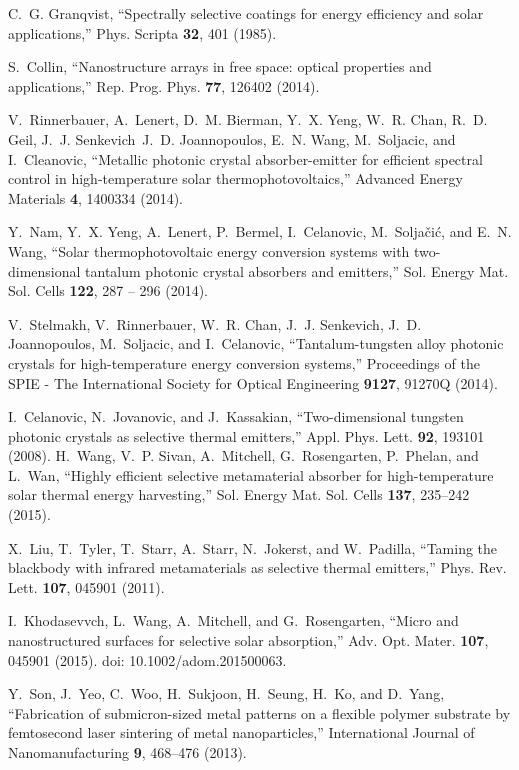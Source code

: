 \documentclass[10pt,letterpaper]{article}
\begin{document}
\begin{thebibliography}{100}
C.~G. Granqvist, \enquote{Spectrally selective coatings for energy efficiency
  and solar applications,} Phys. Scripta \textbf{32}, 401 (1985).

S.~Collin, \enquote{Nanostructure arrays in free space: optical properties and
  applications,} Rep. Prog. Phys. \textbf{77}, 126402 (2014).

V.~Rinnerbauer, A.~Lenert, D.~M. Bierman, Y.~X. Yeng, W.~R. Chan, R.~D. Geil,
  J.~J. Senkevich\, J.~D. Joannopoulos, E.~N. Wang, M.~Soljacic, and
  I.~Cleanovic, \enquote{{Metallic photonic crystal absorber-emitter for
  efficient spectral control in high-temperature solar thermophotovoltaics},}
  Advanced Energy Materials \textbf{4}, 1400334 (2014).

Y.~Nam, Y.~X. Yeng, A.~Lenert, P.~Bermel, I.~Celanovic, M.~Solja\v{c}i\'{c},
  and E.~N. Wang, \enquote{Solar thermophotovoltaic energy conversion systems
  with two-dimensional tantalum photonic crystal absorbers and emitters,} Sol.
  Energy Mat. Sol. Cells \textbf{122}, 287 -- 296 (2014).

V.~Stelmakh, V.~Rinnerbauer, W.~R. Chan, J.~J. Senkevich, J.~D. Joannopoulos,
  M.~Soljacic, and I.~Celanovic, \enquote{Tantalum-tungsten alloy photonic
  crystals for high-temperature energy conversion systems,} Proceedings of the
  SPIE - The International Society for Optical Engineering \textbf{9127},
  91270Q (2014).

I.~Celanovic, N.~Jovanovic, and J.~Kassakian, \enquote{Two-dimensional tungsten
  photonic crystals as selective thermal emitters,} Appl. Phys. Lett.
  \textbf{92}, 193101 (2008).
H.~Wang, V.~P. Sivan, A.~Mitchell, G.~Rosengarten, P.~Phelan, and L.~Wan,
  \enquote{Highly efficient selective metamaterial absorber for
  high-temperature solar thermal energy harvesting,} Sol. Energy Mat. Sol.
  Cells \textbf{137}, 235--242 (2015).

X.~Liu, T.~Tyler, T.~Starr, A.~Starr, N.~Jokerst, and W.~Padilla,
  \enquote{Taming the blackbody with infrared metamaterials as selective
  thermal emitters,} Phys. Rev. Lett. \textbf{107}, 045901 (2011).

I.~Khodasevvch, L.~Wang, A.~Mitchell, and G.~Rosengarten, \enquote{Micro and
  nanostructured surfaces for selective solar absorption,} Adv. Opt. Mater.
  \textbf{107}, 045901 (2015). {doi: 10.1002/adom.201500063}.

Y.~Son, J.~Yeo, C.~Woo, H.~Sukjoon, H.~Seung, H.~Ko, and D.~Yang,
  \enquote{Fabrication of submicron-sized metal patterns on a flexible polymer
  substrate by femtosecond laser sintering of metal nanoparticles,}
  International Journal of Nanomanufacturing \textbf{9}, 468--476 (2013).


\end{thebibliography}
\end{document}

